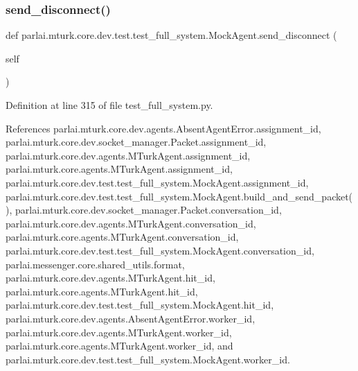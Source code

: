 \subsubsection{\texorpdfstring{send\+\_\+disconnect()}{send\_disconnect()}}
{\footnotesize\ttfamily def parlai.\+mturk.\+core.\+dev.\+test.\+test\+\_\+full\+\_\+system.\+Mock\+Agent.\+send\+\_\+disconnect (\begin{DoxyParamCaption}\item[{}]{self }\end{DoxyParamCaption})}



Definition at line 315 of file test\+\_\+full\+\_\+system.\+py.



References parlai.\+mturk.\+core.\+dev.\+agents.\+Absent\+Agent\+Error.\+assignment\+\_\+id, parlai.\+mturk.\+core.\+dev.\+socket\+\_\+manager.\+Packet.\+assignment\+\_\+id, parlai.\+mturk.\+core.\+dev.\+agents.\+M\+Turk\+Agent.\+assignment\+\_\+id, parlai.\+mturk.\+core.\+agents.\+M\+Turk\+Agent.\+assignment\+\_\+id, parlai.\+mturk.\+core.\+dev.\+test.\+test\+\_\+full\+\_\+system.\+Mock\+Agent.\+assignment\+\_\+id, parlai.\+mturk.\+core.\+dev.\+test.\+test\+\_\+full\+\_\+system.\+Mock\+Agent.\+build\+\_\+and\+\_\+send\+\_\+packet(), parlai.\+mturk.\+core.\+dev.\+socket\+\_\+manager.\+Packet.\+conversation\+\_\+id, parlai.\+mturk.\+core.\+dev.\+agents.\+M\+Turk\+Agent.\+conversation\+\_\+id, parlai.\+mturk.\+core.\+agents.\+M\+Turk\+Agent.\+conversation\+\_\+id, parlai.\+mturk.\+core.\+dev.\+test.\+test\+\_\+full\+\_\+system.\+Mock\+Agent.\+conversation\+\_\+id, parlai.\+messenger.\+core.\+shared\+\_\+utils.\+format, parlai.\+mturk.\+core.\+dev.\+agents.\+M\+Turk\+Agent.\+hit\+\_\+id, parlai.\+mturk.\+core.\+agents.\+M\+Turk\+Agent.\+hit\+\_\+id, parlai.\+mturk.\+core.\+dev.\+test.\+test\+\_\+full\+\_\+system.\+Mock\+Agent.\+hit\+\_\+id, parlai.\+mturk.\+core.\+dev.\+agents.\+Absent\+Agent\+Error.\+worker\+\_\+id, parlai.\+mturk.\+core.\+dev.\+agents.\+M\+Turk\+Agent.\+worker\+\_\+id, parlai.\+mturk.\+core.\+agents.\+M\+Turk\+Agent.\+worker\+\_\+id, and parlai.\+mturk.\+core.\+dev.\+test.\+test\+\_\+full\+\_\+system.\+Mock\+Agent.\+worker\+\_\+id.

